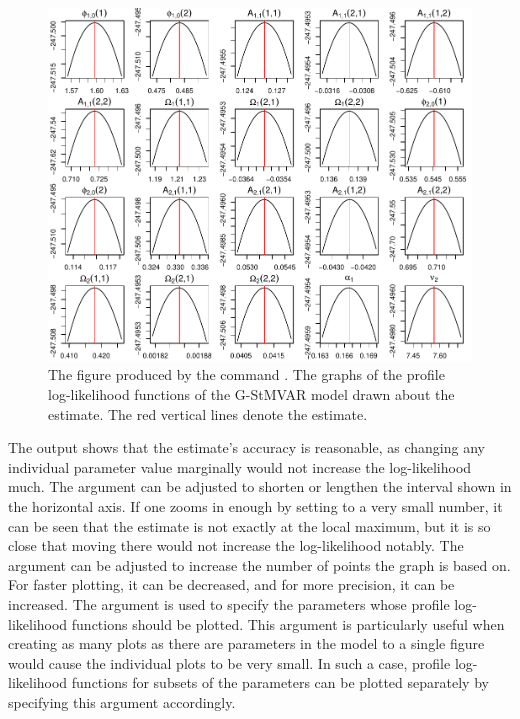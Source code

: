 \documentclass[nojss]{jss}
\begin{document}
\begin{figure}[t]
  \centering
  \includegraphics{figures/proflogliks.pdf}
  \caption{The figure produced by the command . The graphs of the profile log-likelihood functions of the G-StMVAR model drawn about the estimate. The red vertical lines denote the estimate.}
\label{fig:proflogliks}
\end{figure}

The output shows that the estimate's accuracy is reasonable, as changing any individual parameter value marginally would not increase the log-likelihood much. The argument  can be adjusted to shorten or lengthen the interval shown in the horizontal axis. If one zooms in enough by setting  to a very small number, it can be seen that the estimate is not exactly at the local maximum, but it is so close that moving there would not increase the log-likelihood notably. The argument  can be adjusted to increase the number of points the graph is based on. For faster plotting, it can be decreased, and for more precision, it can be increased. The argument  is used to specify the parameters whose profile log-likelihood functions should be plotted. This argument is particularly useful when creating as many plots as there are parameters in the model to a single figure would cause the individual plots to be very small. In such a case, profile log-likelihood functions for subsets of the parameters can be plotted separately by specifying this argument accordingly.
\end{document}
